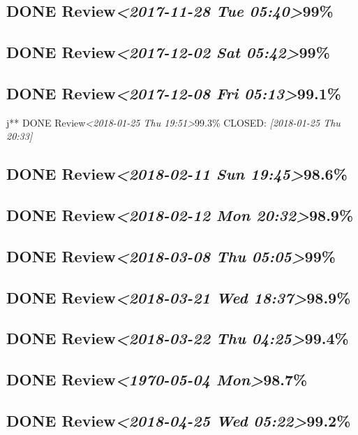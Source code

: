 \documentclass[11pt]{ctexart}
\begin{document}
\subsection{{\bfseries\sffamily DONE} Review\textit{<2017-11-28 Tue 05:40>}99\%}
\label{sec:orgfff578c}
\subsection{{\bfseries\sffamily DONE} Review\textit{<2017-12-02 Sat 05:42>}99\%}
\label{sec:org72c3a3a}
\subsection{{\bfseries\sffamily DONE} Review\textit{<2017-12-08 Fri 05:13>}99.1\%}
\label{sec:org1239521}
j** DONE Review\textit{<2018-01-25 Thu 19:51>}99.3\%
   CLOSED: \textit{[2018-01-25 Thu 20:33]}
\subsection{{\bfseries\sffamily DONE} Review\textit{<2018-02-11 Sun 19:45>}98.6\%}
\label{sec:orgc04f1ad}
\subsection{{\bfseries\sffamily DONE} Review\textit{<2018-02-12 Mon 20:32>}98.9\%}
\label{sec:org6b0b239}
\subsection{{\bfseries\sffamily DONE} Review\textit{<2018-03-08 Thu 05:05>}99\%}
\label{sec:orge2669a5}

\subsection{{\bfseries\sffamily DONE} Review\textit{<2018-03-21 Wed 18:37>}98.9\%}
\label{sec:org8d46646}
\subsection{{\bfseries\sffamily DONE} Review\textit{<2018-03-22 Thu 04:25>}99.4\%}
\label{sec:org5762ddf}
\subsection{{\bfseries\sffamily DONE} Review\textit{<1970-05-04 Mon>}98.7\%}
\label{sec:org1538a36}
\subsection{{\bfseries\sffamily DONE} Review\textit{<2018-04-25 Wed 05:22>}99.2\%}
\label{sec:orgaa035cb}
\end{document}
